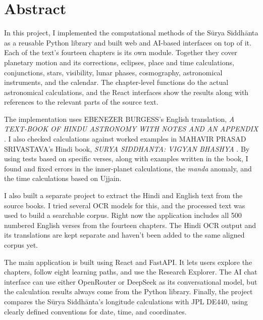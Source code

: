 \documentclass[12pt,a4paper,oneside]{report}
\newcommand{\surya}{Sūrya Siddhānta\xspace}
\begin{document}

\chapter*{Abstract}

In this project, I implemented the computational methods of the \surya as a reusable Python library and built web and AI-based interfaces on top of it. Each of the text's fourteen chapters is its own module. Together they cover planetary motion and its corrections, eclipses, place and time calculations, conjunctions, stars, visibility, lunar phases, cosmography, astronomical instruments, and the calendar. The chapter-level functions do the actual astronomical calculations, and the React interfaces show the results along with references to the relevant parts of the source text.

The implementation uses \MakeUppercase{EBENEZER BURGESS}'s English translation, \MakeUppercase{\emph{A TEXT-BOOK OF HINDU ASTRONOMY WITH NOTES AND AN APPENDIX}} \cite{burgess1860}. I also checked calculations against worked examples in \MakeUppercase{MAHAVIR PRASAD SRIVASTAVA}'s Hindi book, \MakeUppercase{\emph{SURYA SIDDHANTA: VIGYAN BHASHYA}} \cite{shrivastava}. By using tests based on specific verses, along with examples written in the book, I found and fixed errors in the inner-planet calculations, the \emph{manda} anomaly, and the time calculations based on Ujjain.

I also built a separate project to extract the Hindi and English text from the source books. I tried several OCR models for this, and the processed text was used to build a searchable corpus. Right now the application includes all 500 numbered English verses from the fourteen chapters. The Hindi OCR output and its translations are kept separate and haven't been added to the same aligned corpus yet.

The main application is built using React and FastAPI. It lets users explore the chapters, follow eight learning paths, and use the Research Explorer. The AI chat interface can use either OpenRouter or DeepSeek as its conversational model, but the calculation results always come from the Python library. Finally, the project compares the \surya's longitude calculations with JPL DE440, using clearly defined conventions for date, time, and coordinates.

\tableofcontents
\end{document}
